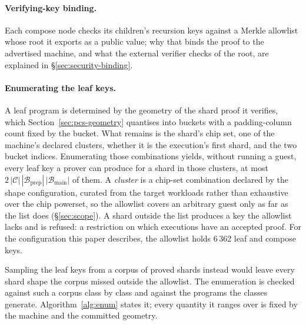 \paragraph{Verifying-key binding.} Each compose node checks its children's recursion keys against a Merkle allowlist whose root it exports as a public value; why that binds the proof to the advertised machine, and what the external verifier checks of the root, are explained in \S\ref{sec:security-binding}.

\paragraph{Enumerating the leaf keys.} A leaf program is determined by the geometry of the shard proof it verifies, which Section~\ref{sec:pcs-geometry} quantises into buckets with a padding-column count fixed by the bucket. What remains is the shard's chip set, one of the machine's declared clusters, whether it is the execution's first shard, and the two bucket indices. Enumerating those combinations yields, without running a guest, every leaf key a prover can produce for a shard in those clusters, at most $2\,|\mathcal C|\,|\mathcal B_{\mathrm{prep}}|\,|\mathcal B_{\mathrm{main}}|$ of them. A \emph{cluster} is a chip-set combination declared by the shape configuration, curated from the target workloads rather than exhaustive over the chip powerset, so the allowlist covers an arbitrary guest only as far as the list does (\S\ref{sec:scope}). A shard outside the list produces a key the allowlist lacks and is refused: a restriction on which executions have an accepted proof. For the configuration this paper describes, the allowlist holds 6\,362 leaf and compose keys.

Sampling the leaf keys from a corpus of proved shards instead would leave every shard shape the corpus missed outside the allowlist. The enumeration is checked against such a corpus class by class and against the programs the classes generate. Algorithm~\ref{alg:enum} states it; every quantity it ranges over is fixed by the machine and the committed geometry.

